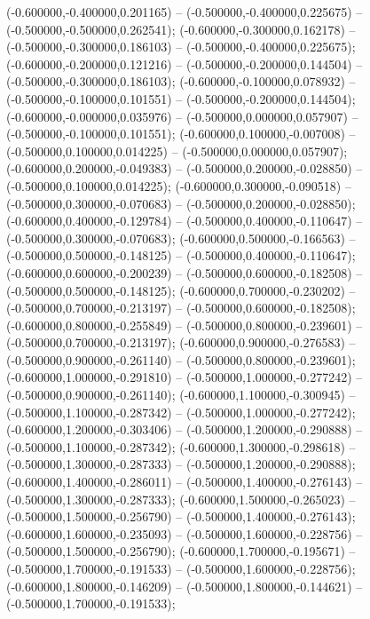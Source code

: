  (-0.600000,-0.400000,0.201165) -- (-0.500000,-0.400000,0.225675) -- (-0.500000,-0.500000,0.262541);
 (-0.600000,-0.300000,0.162178) -- (-0.500000,-0.300000,0.186103) -- (-0.500000,-0.400000,0.225675);
 (-0.600000,-0.200000,0.121216) -- (-0.500000,-0.200000,0.144504) -- (-0.500000,-0.300000,0.186103);
 (-0.600000,-0.100000,0.078932) -- (-0.500000,-0.100000,0.101551) -- (-0.500000,-0.200000,0.144504);
 (-0.600000,-0.000000,0.035976) -- (-0.500000,0.000000,0.057907) -- (-0.500000,-0.100000,0.101551);
 (-0.600000,0.100000,-0.007008) -- (-0.500000,0.100000,0.014225) -- (-0.500000,0.000000,0.057907);
 (-0.600000,0.200000,-0.049383) -- (-0.500000,0.200000,-0.028850) -- (-0.500000,0.100000,0.014225);
 (-0.600000,0.300000,-0.090518) -- (-0.500000,0.300000,-0.070683) -- (-0.500000,0.200000,-0.028850);
 (-0.600000,0.400000,-0.129784) -- (-0.500000,0.400000,-0.110647) -- (-0.500000,0.300000,-0.070683);
 (-0.600000,0.500000,-0.166563) -- (-0.500000,0.500000,-0.148125) -- (-0.500000,0.400000,-0.110647);
 (-0.600000,0.600000,-0.200239) -- (-0.500000,0.600000,-0.182508) -- (-0.500000,0.500000,-0.148125);
 (-0.600000,0.700000,-0.230202) -- (-0.500000,0.700000,-0.213197) -- (-0.500000,0.600000,-0.182508);
 (-0.600000,0.800000,-0.255849) -- (-0.500000,0.800000,-0.239601) -- (-0.500000,0.700000,-0.213197);
 (-0.600000,0.900000,-0.276583) -- (-0.500000,0.900000,-0.261140) -- (-0.500000,0.800000,-0.239601);
 (-0.600000,1.000000,-0.291810) -- (-0.500000,1.000000,-0.277242) -- (-0.500000,0.900000,-0.261140);
 (-0.600000,1.100000,-0.300945) -- (-0.500000,1.100000,-0.287342) -- (-0.500000,1.000000,-0.277242);
 (-0.600000,1.200000,-0.303406) -- (-0.500000,1.200000,-0.290888) -- (-0.500000,1.100000,-0.287342);
 (-0.600000,1.300000,-0.298618) -- (-0.500000,1.300000,-0.287333) -- (-0.500000,1.200000,-0.290888);
 (-0.600000,1.400000,-0.286011) -- (-0.500000,1.400000,-0.276143) -- (-0.500000,1.300000,-0.287333);
 (-0.600000,1.500000,-0.265023) -- (-0.500000,1.500000,-0.256790) -- (-0.500000,1.400000,-0.276143);
 (-0.600000,1.600000,-0.235093) -- (-0.500000,1.600000,-0.228756) -- (-0.500000,1.500000,-0.256790);
 (-0.600000,1.700000,-0.195671) -- (-0.500000,1.700000,-0.191533) -- (-0.500000,1.600000,-0.228756);
 (-0.600000,1.800000,-0.146209) -- (-0.500000,1.800000,-0.144621) -- (-0.500000,1.700000,-0.191533);
